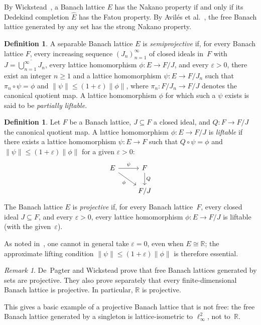 \documentclass[12pt]{amsart}
\renewcommand{\le}{\leqslant}
\renewcommand{\ge}{\geqslant}
\theoremstyle{plain}
\theoremstyle{definition}
\newtheorem{definition}[theorem]{Definition}
\theoremstyle{remark}
\newtheorem{remark}[theorem]{Remark}
\newcommand{\R}{\mathbb{R}}
\begin{document}
By Wickstead~\cite{Wick2007nak}, a Banach lattice $E$ has the Nakano property if
and only if its Dedekind completion $\hat{E}$ has the Fatou property.  By
Avil\'es et al.~\cite{aviles2018free}, the free Banach lattice generated by any
set has the strong Nakano property.

\begin{definition}\label{def:semiprojective}
A separable Banach lattice $E$ is \emph{semiprojective} if, for every Banach lattice $F$,
every increasing sequence
$(J_n)_{n=1}^\infty$ of closed ideals in~$F$ with
$J = \overline{\bigcup_{n=1}^\infty J_n}$, every lattice homomorphism
$\phi \colon E \to F/J$, and every $\varepsilon > 0$, there exist an integer
$n \ge 1$ and a lattice homomorphism
$\psi \colon E \to F/J_n$ such that
$\pi_n \circ \psi = \phi$ and
$\lVert \psi \rVert \le (1 + \varepsilon) \lVert \phi \rVert$,
where $\pi_n \colon F/J_n \to F/J$ denotes the canonical quotient map.
A lattice homomorphism $\phi$ for which such a $\psi$ exists is said to be
\emph{partially liftable}.
\end{definition}

\begin{definition}\label{def:projective}
Let $F$ be a Banach lattice, $J \subseteq F$ a closed ideal, and
$Q \colon F \to F/J$ the canonical quotient map.  A lattice homomorphism
$\phi \colon E \to F/J$ is \emph{liftable} if there exists a lattice
homomorphism $\psi \colon E \to F$ such that $Q \circ \psi = \phi$ and
$\lVert \psi \rVert \le (1 + \varepsilon) \lVert \phi \rVert$ for a given
$\varepsilon > 0$:
\[
    \begin{tikzcd}
    E \arrow[r, "\psi"] \arrow[rd, "\phi"'] & F \arrow[d, "Q"] \\
                                              & F/J
    \end{tikzcd}
\]
The Banach lattice $E$ is \emph{projective} if, for
every Banach lattice~$F$, every closed ideal $J \subseteq F$, and every
$\varepsilon > 0$, every lattice homomorphism $\phi \colon E \to F/J$ is
liftable (with the given~$\varepsilon$).
\end{definition}

As noted in~\cite{de2015free}, one cannot in general take $\varepsilon = 0$, even
when $E \cong \R$; the approximate lifting condition
$\lVert \psi \rVert \le (1 + \varepsilon) \lVert \phi \rVert$ is therefore
essential.

\begin{remark}\label{rem:proj-examples}
De~Pagter and Wickstead prove that free Banach lattices generated by sets
are projective.  They also prove separately that every finite-dimensional
Banach lattice is projective.  In particular, $\R$ is projective.

This gives a basic example of a projective Banach lattice that is not free:
the free Banach lattice generated by a singleton is lattice-isometric to
$\ell_\infty^2$, not to~$\R$.
\end{remark}
\end{document}
